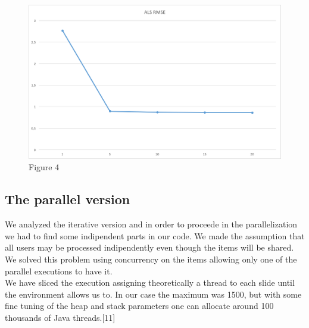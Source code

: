 \documentclass{sig-alternate-05-2015}
\begin{document}
\begin{figure}
    \caption{Figure 4}
    \centering
    \includegraphics[scale=0.4]{alsrmse.png}
\end{figure}

\subsection{The parallel version}
We analyzed the iterative version and in order to proceede in the parallelization
we had to find some indipendent parts in our code. We made the assumption
that all users may be processed indipendently even though the items will be shared.
We solved this problem using concurrency on the items allowing only one of the
parallel executions to have it. \\
We have sliced the execution assigning theoretically a thread to each slide
until the environment allows us to. In our case the maximum was 1500, but with
some fine tuning of the heap and stack parameters one can allocate around 100 thousands
of Java threads.[11]\\
\end{document}
